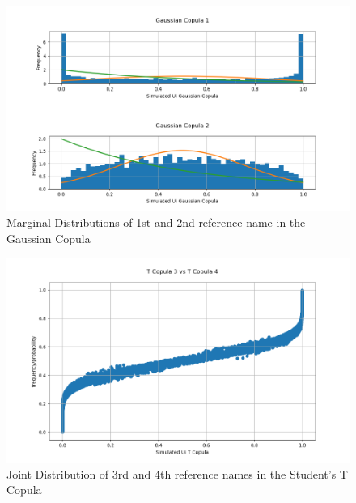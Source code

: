 \documentclass{report}
\theoremstyle{plain}
\theoremstyle{definition}
\begin{document}
\begin{figure}[H]
	\begin{center}
		\includegraphics[width=15cm]{Gaussian_Copula_1.png}
		\caption{Marginal Distributions of 1st and 2nd reference name in the Gaussian Copula} 
		\label{Gaussian_Copula_1}
	\end{center}
\end{figure}

\begin{figure}[H]
	\begin{center}
		\includegraphics[width=15cm]{T_Copula_3_vs_T_Copula_4.png}
		\caption{Joint Distribution of 3rd and 4th reference names in the Student's T Copula} 
		\label{T_Copula_3_vs_T_Copula_4}
	\end{center}
\end{figure}
\end{document}

